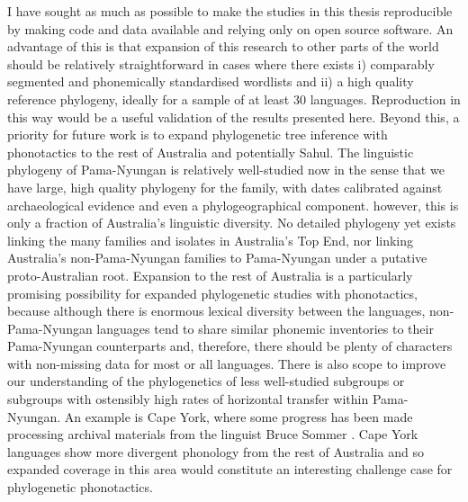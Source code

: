 I have sought as much as possible to make the studies in this thesis reproducible by making code and data available and relying only on open source software. An advantage of this is that expansion of this research to other parts of the world should be relatively straightforward in cases where there exists i) comparably segmented and phonemically standardised wordlists and ii) a high quality reference phylogeny, ideally for a sample of at least 30 languages. Reproduction in this way would be a useful validation of the results presented here. Beyond this, a priority for future work is to expand phylogenetic tree inference with phonotactics to the rest of Australia and potentially Sahul. The linguistic phylogeny of Pama-Nyungan is relatively well-studied now in the sense that we have large, high quality phylogeny for the family, with dates calibrated against archaeological evidence and even a phylogeographical component. however, this is only a fraction of Australia's linguistic diversity. No detailed phylogeny yet exists linking the many families and isolates in Australia's Top End, nor linking Australia's non-Pama-Nyungan families to Pama-Nyungan under a putative proto-Australian root. Expansion to the rest of Australia is a particularly promising possibility for expanded phylogenetic studies with phonotactics, because although there is enormous lexical diversity between the languages, non-Pama-Nyungan languages tend to share similar phonemic inventories to their Pama-Nyungan counterparts and, therefore, there should be plenty of characters with non-missing data for most or all languages. There is also scope to improve our understanding of the phylogenetics of less well-studied subgroups or subgroups with ostensibly high rates of horizontal transfer within Pama-Nyungan. An example is Cape York, where some progress has been made processing archival materials from the linguist Bruce Sommer \autocite{hollis_cape_2016}. Cape York languages show more divergent phonology from the rest of Australia and so expanded coverage in this area would constitute an interesting challenge case for phylogenetic phonotactics.

